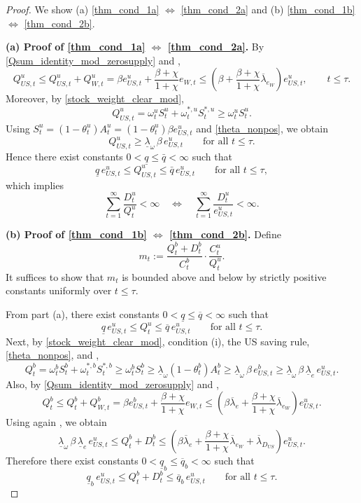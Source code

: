 \documentclass[12pt]{article}
\theoremstyle{plain}
\begin{document}
\begin{proof}
We show (a) \eqref{thm_cond_1a} $\Longleftrightarrow$ \eqref{thm_cond_2a} and
(b) \eqref{thm_cond_1b} $\Longleftrightarrow$ \eqref{thm_cond_2b}.

\medskip
\noindent\textbf{(a) Proof of \eqref{thm_cond_1a} $\Longleftrightarrow$ \eqref{thm_cond_2a}.}
By \eqref{Qsum_identity_mod_zerosupply} and ,
\[
Q_{US,t}^u \le Q_{US,t}^u+Q_{W,t}^u
=\beta e_{US,t}^u+\frac{\beta+\chi}{1+\chi}e_{W,t}
\le \left(\beta+\frac{\beta+\chi}{1+\chi}\overline\lambda_{e_W}\right)e_{US,t}^u,
\qquad t\le\tau.
\]
Moreover, by \eqref{stock_weight_clear_mod},
\[
Q_{US,t}^u=\omega_t^u S_t^u+\omega_t^{*,u}S_t^{*,u}\ge \omega_t^u S_t^u.
\]
Using $S_t^u=(1-\theta_t^u)A_t^u=(1-\theta_t^u)\beta e_{US,t}^u$ and \eqref{theta_nonpos}, we obtain
\[
Q_{US,t}^u\ge \underline\lambda_\omega\,\beta\,e_{US,t}^u
\qquad\text{for all }t\le\tau.
\]
Hence there exist constants $0<\underline q\le \bar q<\infty$ such that
\[
\underline q\,e_{US,t}^u\le Q_{US,t}^u\le \bar q\,e_{US,t}^u
\qquad\text{for all }t\le\tau,
\]
which implies
\[
\sum_{t=1}^\infty \frac{D_t^u}{Q_t^u}<\infty
\quad\Longleftrightarrow\quad
\sum_{t=1}^\infty \frac{D_t^u}{e_{US,t}^u}<\infty.
\]

\medskip
\noindent\textbf{(b) Proof of \eqref{thm_cond_1b} $\Longleftrightarrow$ \eqref{thm_cond_2b}.}
Define
\[
m_t:=\frac{Q_t^b+D_t^b}{C_t^b}\cdot \frac{C_t^u}{Q_t^u}.
\]
It suffices to show that $m_t$ is bounded above and below by strictly positive constants uniformly over $t\le\tau$.

From part (a), there exist constants $0<\underline q\le \overline q<\infty$ such that
\[
\underline q\,e_{US,t}^u\le Q_t^u\le \overline q\,e_{US,t}^u
\qquad\text{for all }t\le\tau.
\]
Next, by \eqref{stock_weight_clear_mod}, condition (i), the US saving rule, \eqref{theta_nonpos}, and ,
\[
Q_t^b=\omega_t^b S_t^b+\omega_t^{*,b}S_t^{*,b}
\ge \omega_t^b S_t^b
\ge \underline\lambda_\omega (1-\theta_t^b)A_t^b
\ge \underline\lambda_\omega\,\beta\,e_{US,t}^b
\ge \underline\lambda_\omega\,\beta\,\underline\lambda_e\,e_{US,t}^u.
\]
Also, by \eqref{Qsum_identity_mod_zerosupply} and ,
\[
Q_t^b\le Q_t^b+Q_{W,t}^b
=\beta e_{US,t}^b+\frac{\beta+\chi}{1+\chi}e_{W,t}
\le
\left(\beta\overline\lambda_e+\frac{\beta+\chi}{1+\chi}\overline\lambda_{e_W}\right)e_{US,t}^u.
\]
Using again , we obtain
\[
\underline\lambda_\omega\,\beta\,\underline\lambda_e\,e_{US,t}^u
\le Q_t^b+D_t^b
\le
\left(\beta\overline\lambda_e+\frac{\beta+\chi}{1+\chi}\overline\lambda_{e_W}+\overline\lambda_{D_{US}}\right)e_{US,t}^u.
\]
Therefore there exist constants $0<\underline q_b\le \overline q_b<\infty$ such that
\[
\underline q_b\,e_{US,t}^u
\le
Q_t^b+D_t^b
\le
\overline q_b\,e_{US,t}^u
\qquad\text{for all }t\le\tau.
\]


\end{proof}
\end{document}
